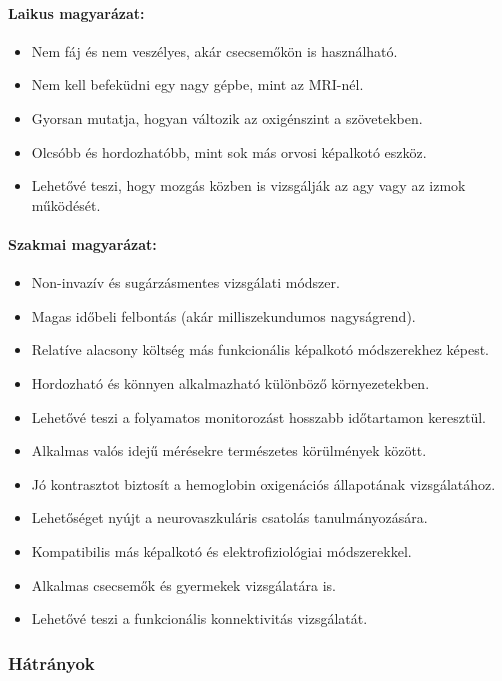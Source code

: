 \documentclass[a4paper,12pt]{article}
\begin{document}
\paragraph{Laikus magyarázat:} \begin{itemize} \item Nem fáj és nem veszélyes, akár csecsemőkön is használható. \item Nem kell befeküdni egy nagy gépbe, mint az MRI-nél. \item Gyorsan mutatja, hogyan változik az oxigénszint a szövetekben. \item Olcsóbb és hordozhatóbb, mint sok más orvosi képalkotó eszköz. \item Lehetővé teszi, hogy mozgás közben is vizsgálják az agy vagy az izmok működését. \end{itemize}

\paragraph{Szakmai magyarázat:} \begin{itemize} \item Non-invazív és sugárzásmentes vizsgálati módszer. \item Magas időbeli felbontás (akár milliszekundumos nagyságrend). \item Relatíve alacsony költség más funkcionális képalkotó módszerekhez képest. \item Hordozható és könnyen alkalmazható különböző környezetekben. \item Lehetővé teszi a folyamatos monitorozást hosszabb időtartamon keresztül. \item Alkalmas valós idejű mérésekre természetes körülmények között. \item Jó kontrasztot biztosít a hemoglobin oxigenációs állapotának vizsgálatához. \item Lehetőséget nyújt a neurovaszkuláris csatolás tanulmányozására. \item Kompatibilis más képalkotó és elektrofiziológiai módszerekkel. \item Alkalmas csecsemők és gyermekek vizsgálatára is. \item Lehetővé teszi a funkcionális konnektivitás vizsgálatát. \end{itemize}

\subsubsection{Hátrányok}
\end{document}
